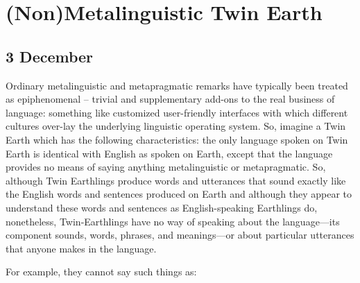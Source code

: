 \documentclass[]{article}
\date{}
\begin{document}
\section{(Non)Metalinguistic Twin
Earth}\label{nonmetalinguistic-twin-earth}

\subsection{3 December}\label{december}

Ordinary metalinguistic and metapragmatic remarks have typically been
treated as epiphenomenal -- trivial and supplementary add-ons to the
real business of language: something like customized user-friendly
interfaces with which different cultures over-lay the underlying
linguistic operating system. So, imagine a Twin Earth which has the
following characteristics: the only language spoken on Twin Earth is
identical with English as spoken on Earth, except that the language
provides no means of saying anything metalinguistic or metapragmatic.
So, although Twin Earthlings produce words and utterances that sound
exactly like the English words and sentences produced on Earth and
although they appear to understand these words and sentences as
English-speaking Earthlings do, nonetheless, Twin-Earthlings have no way
of speaking about the language---its component sounds, words, phrases,
and meanings---or about particular utterances that anyone makes in the
language.

For example, they cannot say such things as:
\end{document}

